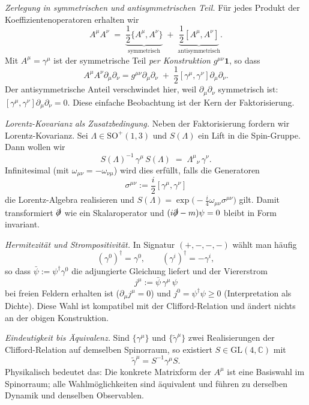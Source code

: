 \documentclass[10pt, letterpaper]{article}
\newcommand{\C}{\mathbb{C}}
\newcommand{\GL}{\mathrm{GL}}
\newcommand{\SO}{\mathrm{SO}}
\begin{document}
\emph{Zerlegung in symmetrischen und antisymmetrischen Teil.}
Für jedes Produkt der Koeffizientenoperatoren erhalten wir
\[
A^\mu A^\nu \;=\; \underbrace{\frac12\{A^\mu,A^\nu\}}_{\text{symmetrisch}} 
\;+\; \underbrace{\frac12[A^\mu,A^\nu]}_{\text{antisymmetrisch}}.
\]
Mit $A^\mu=\gamma^\mu$ ist der symmetrische Teil \emph{per Konstruktion} $g^{\mu\nu}\mathbf 1$, so dass
\[
A^\mu A^\nu \partial_\mu\partial_\nu
= g^{\mu\nu}\partial_\mu\partial_\nu \;+\; \frac12[\gamma^\mu,\gamma^\nu]\partial_\mu\partial_\nu.
\]
Der antisymmetrische Anteil verschwindet hier, weil $\partial_\mu\partial_\nu$ symmetrisch ist:
\(
[\gamma^\mu,\gamma^\nu]\partial_\mu\partial_\nu
=0.
\)
Diese einfache Beobachtung ist der Kern der Faktorisierung.

\emph{Lorentz-Kovarianz als Zusatzbedingung.}
Neben der Faktorisierung fordern wir Lorentz-Kovarianz. Sei $\Lambda\in \SO^+(1,3)$ und $S(\Lambda)$ ein Lift in die Spin-Gruppe. Dann wollen wir
\[
S(\Lambda)^{-1}\,\gamma^\mu\,S(\Lambda) \;=\; \Lambda^\mu{}_\nu \,\gamma^\nu.
\]
Infinitesimal (mit $\omega_{\mu\nu}=-\omega_{\nu\mu}$) wird dies erfüllt, falls die Generatoren
\[
\sigma^{\mu\nu}:=\frac{i}{2}[\gamma^\mu,\gamma^\nu]
\]
die Lorentz-Algebra realisieren und $S(\Lambda)=\exp\!\big(-\tfrac{i}{4}\omega_{\mu\nu}\sigma^{\mu\nu}\big)$ gilt. Damit transformiert $\slashed{\partial}$ wie ein Skalaroperator und $(i\slashed{\partial}-m)\psi=0$ bleibt in Form invariant.

\emph{Hermitezität und Strompositivität.}
In Signatur $(+,-,-,-)$ wählt man häufig
\[
(\gamma^0)^\dagger=\gamma^0,\qquad (\gamma^i)^\dagger=-\gamma^i,
\]
so dass $\bar\psi:=\psi^\dagger\gamma^0$ die adjungierte Gleichung liefert und der Viererstrom
\[
j^\mu:=\bar\psi\,\gamma^\mu\,\psi
\]
bei freien Feldern erhalten ist ($\partial_\mu j^\mu=0$) und $j^0=\psi^\dagger\psi\ge 0$ (Interpretation als Dichte). Diese Wahl ist kompatibel mit der Clifford-Relation und ändert nichts an der obigen Konstruktion.

\emph{Eindeutigkeit bis Äquivalenz.}
Sind $\{\gamma^\mu\}$ und $\{\tilde\gamma^\mu\}$ zwei Realisierungen der Clifford-Relation auf demselben Spinorraum, so existiert $S\in \GL(4,\C)$ mit
\[
\tilde\gamma^\mu = S^{-1}\gamma^\mu S.
\]
Physikalisch bedeutet das: Die konkrete Matrixform der $A^\mu$ ist eine Basiswahl im Spinorraum; alle Wahlmöglichkeiten sind äquivalent und führen zu derselben Dynamik und denselben Observablen.
\end{document}
